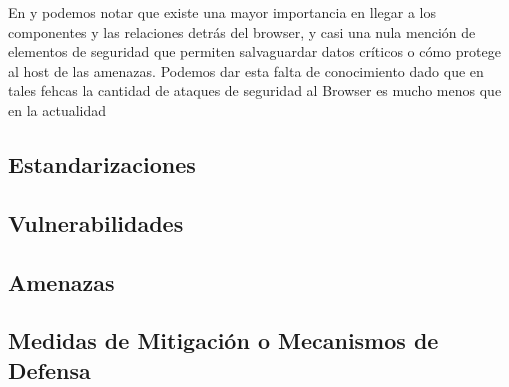 En \cite{2005-grosskurth-browser-refarch} y \cite{preprint-grosskurth-browser-archevol} podemos notar que existe una mayor importancia en llegar a los componentes y las relaciones detrás del browser, y casi una nula mención de elementos de seguridad que permiten salvaguardar datos críticos o cómo protege al host de las amenazas. Podemos dar esta falta de conocimiento dado que en tales fehcas la cantidad de ataques de seguridad al Browser es mucho menos que en la actualidad %


\subsection{Estandarizaciones}
\label{chap3:Standars}

\subsection{Vulnerabilidades}
\label{chap3:vuln}

\subsection{Amenazas}
\label{chap3:threats}

\subsection{Medidas de Mitigación o Mecanismos de Defensa}
\label{chap3:mitig}

